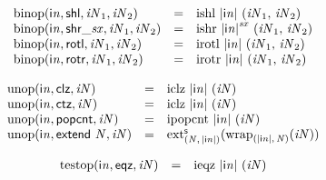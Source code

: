 $$\begin{array}{@{}lcl@{}l@{}}
{\mathrm{binop}}({\mathsf{i}}{{\mathit{n}}}, \mathsf{shl}, {\mathit{iN}}_{{1}}, {\mathit{iN}}_{{2}}) &=& {\mathrm{ishl}}~{|{\mathsf{i}}{{\mathit{n}}}|}~({\mathit{iN}}_{{1}},\, {\mathit{iN}}_{{2}}) &  \\
{\mathrm{binop}}({\mathsf{i}}{{\mathit{n}}}, {\mathsf{shr\_}}{{\mathit{sx}}}, {\mathit{iN}}_{{1}}, {\mathit{iN}}_{{2}}) &=& {\mathrm{ishr}}~{{|{\mathsf{i}}{{\mathit{n}}}|}^{{\mathit{sx}}}}~({\mathit{iN}}_{{1}},\, {\mathit{iN}}_{{2}}) &  \\
{\mathrm{binop}}({\mathsf{i}}{{\mathit{n}}}, \mathsf{rotl}, {\mathit{iN}}_{{1}}, {\mathit{iN}}_{{2}}) &=& {\mathrm{irotl}}~{|{\mathsf{i}}{{\mathit{n}}}|}~({\mathit{iN}}_{{1}},\, {\mathit{iN}}_{{2}}) &  \\
{\mathrm{binop}}({\mathsf{i}}{{\mathit{n}}}, \mathsf{rotr}, {\mathit{iN}}_{{1}}, {\mathit{iN}}_{{2}}) &=& {\mathrm{irotr}}~{|{\mathsf{i}}{{\mathit{n}}}|}~({\mathit{iN}}_{{1}},\, {\mathit{iN}}_{{2}}) &  \\
\end{array}
$$

$$
\begin{array}{@{}lcl@{}l@{}}
{\mathrm{unop}}({\mathsf{i}}{{\mathit{n}}}, \mathsf{clz}, {\mathit{iN}}) &=& {\mathrm{iclz}}~{|{\mathsf{i}}{{\mathit{n}}}|}~({\mathit{iN}}) &  \\
{\mathrm{unop}}({\mathsf{i}}{{\mathit{n}}}, \mathsf{ctz}, {\mathit{iN}}) &=& {\mathrm{iclz}}~{|{\mathsf{i}}{{\mathit{n}}}|}~({\mathit{iN}}) &  \\
{\mathrm{unop}}({\mathsf{i}}{{\mathit{n}}}, \mathsf{popcnt}, {\mathit{iN}}) &=& {\mathrm{ipopcnt}}~{|{\mathsf{i}}{{\mathit{n}}}|}~({\mathit{iN}}) &  \\
{\mathrm{unop}}({\mathsf{i}}{{\mathit{n}}}, \mathsf{extend}~{\mathit{N}}, {\mathit{iN}}) &=& {{{{\mathrm{ext}}}_{({\mathit{N}},\, {|{\mathsf{i}}{{\mathit{n}}}|})}^{\mathsf{s}}}}{({{{\mathrm{wrap}}}_{({|{\mathsf{i}}{{\mathit{n}}}|},\, {\mathit{N}})}}{({\mathit{iN}})})} &  \\
\end{array}
$$

$$
\begin{array}{@{}lcl@{}l@{}}
{\mathrm{testop}}({\mathsf{i}}{{\mathit{n}}}, \mathsf{eqz}, {\mathit{iN}}) &=& {\mathrm{ieqz}}~{|{\mathsf{i}}{{\mathit{n}}}|}~({\mathit{iN}}) &  \\
\end{array}
$$

